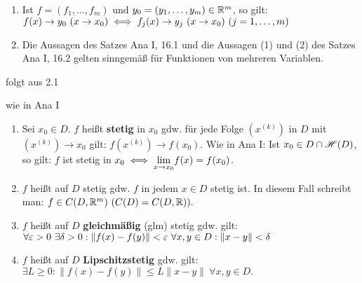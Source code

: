 \documentclass[a4paper,oneside,DIV15,BCOR12mm,chapterprefix=true,headings=onelinechapter]{scrbook}
\begin{document}
\begin{satz}
\begin{enumerate}
\item Ist $f = (f_1,\ldots,f_m)$ und $y_0 = (y_1,\ldots,y_m) \in \mathbb{R}^m$, so gilt: $f(x) \to y_0\ (x \to x_0) \equizu f_j(x) \to y_j\ (x \to x_0)\ (j=1,\ldots,m)$
\item Die Aussagen des Satzes Ana I, 16.1 und die Aussagen (1) und (2) des Satzes Ana I, 16.2 gelten sinngemäß für Funktionen von mehreren Variablen.
\end{enumerate}
\end{satz}

\begin{beweise}
\item folgt aus 2.1
\item wie in Ana I
\end{beweise}

\begin{definition*}
\begin{enumerate}
\item {}Sei $x_0 \in D$. $f$ heißt \textbf{stetig} in $x_0$ gdw. für jede Folge $(x^{(k)})$ in $D$ mit $(x^{(k)}) \to x_0$ gilt: $f(x^{(k)}) \to f(x_0)$. Wie in Ana I: Ist $x_0 \in D \cap \mathscr{H}(D)$, so gilt: $f$ ist stetig in $x_0 \iff \displaystyle{\lim_{x \to x_0}} f(x) = f(x_0)$.
\item {}$f$ heißt auf $D$ stetig gdw. $f$ in jedem $x \in D$ stetig ist. In diesem Fall schreibt man: $f \in C(D,\mathbb{R}^m)\ (C(D) = C(D,\mathbb{R})).$
\item {}$f$ heißt auf $D$ \textbf{gleichmäßig} (glm) stetig gdw. gilt:\\
$\forall \varepsilon>0\ \exists \delta>0: \|f(x)-f(y)\| < \varepsilon\ \forall x,y \in D: \|x-y\| < \delta$
\item {}$f$ heißt auf $D$  \textbf{Lipschitzstetig} gdw. gilt:\\
$\exists L\ge0: \|f(x)-f(y)\| \le L\|x-y\|\ \forall x,y \in D.$
\end{enumerate}
\end{definition*}
\end{document}

